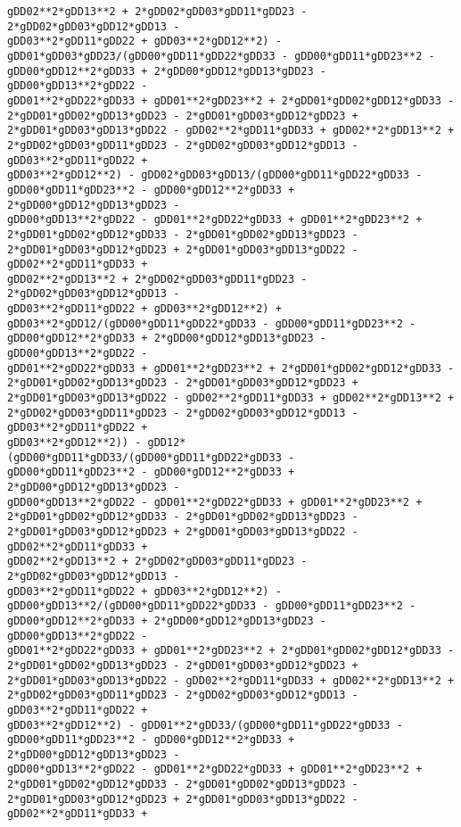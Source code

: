 \documentclass[landscape,letterpaper,10pt,english]{article}
\begin{document}
\begin{Verbatim}[commandchars=\\\{\}]
gDD02**2*gDD13**2 + 2*gDD02*gDD03*gDD11*gDD23 - 2*gDD02*gDD03*gDD12*gDD13 -
gDD03**2*gDD11*gDD22 + gDD03**2*gDD12**2) -
gDD01*gDD03*gDD23/(gDD00*gDD11*gDD22*gDD33 - gDD00*gDD11*gDD23**2 -
gDD00*gDD12**2*gDD33 + 2*gDD00*gDD12*gDD13*gDD23 - gDD00*gDD13**2*gDD22 -
gDD01**2*gDD22*gDD33 + gDD01**2*gDD23**2 + 2*gDD01*gDD02*gDD12*gDD33 -
2*gDD01*gDD02*gDD13*gDD23 - 2*gDD01*gDD03*gDD12*gDD23 +
2*gDD01*gDD03*gDD13*gDD22 - gDD02**2*gDD11*gDD33 + gDD02**2*gDD13**2 +
2*gDD02*gDD03*gDD11*gDD23 - 2*gDD02*gDD03*gDD12*gDD13 - gDD03**2*gDD11*gDD22 +
gDD03**2*gDD12**2) - gDD02*gDD03*gDD13/(gDD00*gDD11*gDD22*gDD33 -
gDD00*gDD11*gDD23**2 - gDD00*gDD12**2*gDD33 + 2*gDD00*gDD12*gDD13*gDD23 -
gDD00*gDD13**2*gDD22 - gDD01**2*gDD22*gDD33 + gDD01**2*gDD23**2 +
2*gDD01*gDD02*gDD12*gDD33 - 2*gDD01*gDD02*gDD13*gDD23 -
2*gDD01*gDD03*gDD12*gDD23 + 2*gDD01*gDD03*gDD13*gDD22 - gDD02**2*gDD11*gDD33 +
gDD02**2*gDD13**2 + 2*gDD02*gDD03*gDD11*gDD23 - 2*gDD02*gDD03*gDD12*gDD13 -
gDD03**2*gDD11*gDD22 + gDD03**2*gDD12**2) +
gDD03**2*gDD12/(gDD00*gDD11*gDD22*gDD33 - gDD00*gDD11*gDD23**2 -
gDD00*gDD12**2*gDD33 + 2*gDD00*gDD12*gDD13*gDD23 - gDD00*gDD13**2*gDD22 -
gDD01**2*gDD22*gDD33 + gDD01**2*gDD23**2 + 2*gDD01*gDD02*gDD12*gDD33 -
2*gDD01*gDD02*gDD13*gDD23 - 2*gDD01*gDD03*gDD12*gDD23 +
2*gDD01*gDD03*gDD13*gDD22 - gDD02**2*gDD11*gDD33 + gDD02**2*gDD13**2 +
2*gDD02*gDD03*gDD11*gDD23 - 2*gDD02*gDD03*gDD12*gDD13 - gDD03**2*gDD11*gDD22 +
gDD03**2*gDD12**2)) - gDD12*(gDD00*gDD11*gDD33/(gDD00*gDD11*gDD22*gDD33 -
gDD00*gDD11*gDD23**2 - gDD00*gDD12**2*gDD33 + 2*gDD00*gDD12*gDD13*gDD23 -
gDD00*gDD13**2*gDD22 - gDD01**2*gDD22*gDD33 + gDD01**2*gDD23**2 +
2*gDD01*gDD02*gDD12*gDD33 - 2*gDD01*gDD02*gDD13*gDD23 -
2*gDD01*gDD03*gDD12*gDD23 + 2*gDD01*gDD03*gDD13*gDD22 - gDD02**2*gDD11*gDD33 +
gDD02**2*gDD13**2 + 2*gDD02*gDD03*gDD11*gDD23 - 2*gDD02*gDD03*gDD12*gDD13 -
gDD03**2*gDD11*gDD22 + gDD03**2*gDD12**2) -
gDD00*gDD13**2/(gDD00*gDD11*gDD22*gDD33 - gDD00*gDD11*gDD23**2 -
gDD00*gDD12**2*gDD33 + 2*gDD00*gDD12*gDD13*gDD23 - gDD00*gDD13**2*gDD22 -
gDD01**2*gDD22*gDD33 + gDD01**2*gDD23**2 + 2*gDD01*gDD02*gDD12*gDD33 -
2*gDD01*gDD02*gDD13*gDD23 - 2*gDD01*gDD03*gDD12*gDD23 +
2*gDD01*gDD03*gDD13*gDD22 - gDD02**2*gDD11*gDD33 + gDD02**2*gDD13**2 +
2*gDD02*gDD03*gDD11*gDD23 - 2*gDD02*gDD03*gDD12*gDD13 - gDD03**2*gDD11*gDD22 +
gDD03**2*gDD12**2) - gDD01**2*gDD33/(gDD00*gDD11*gDD22*gDD33 -
gDD00*gDD11*gDD23**2 - gDD00*gDD12**2*gDD33 + 2*gDD00*gDD12*gDD13*gDD23 -
gDD00*gDD13**2*gDD22 - gDD01**2*gDD22*gDD33 + gDD01**2*gDD23**2 +
2*gDD01*gDD02*gDD12*gDD33 - 2*gDD01*gDD02*gDD13*gDD23 -
2*gDD01*gDD03*gDD12*gDD23 + 2*gDD01*gDD03*gDD13*gDD22 - gDD02**2*gDD11*gDD33 +

\end{Verbatim}
\end{document}
